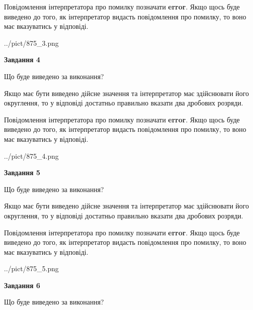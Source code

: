 \documentclass[12pt, ukrainian]{article}
\begin{document}
{\begin {Large}
Повідомлення інтерпретатора про помилку позначати \textbf{error}.
Якщо щось буде виведено до того, як інтерпретатор видасть повідомлення про помилку, 
то воно має вказуватись у відповіді. \par

\begin{center}
	{../pict/875_3.png}
\end{center}
\newpage

{\begin {center}\textbf{Завдання 4}\end {center}}\par
Що буде виведено за виконання? \par

Якщо має бути виведено дійсне значення та інтерпретатор має здійснювати його округлення, 
то у відповіді достатньо правильно вказати два дробових розряди.

Повідомлення інтерпретатора про помилку позначати \textbf{error}.
Якщо щось буде виведено до того, як інтерпретатор видасть повідомлення про помилку, 
то воно має вказуватись у відповіді. \par

\begin{center}
	{../pict/875_4.png}
\end{center}
\newpage

{\begin {center}\textbf{Завдання 5}\end {center}}\par
Що буде виведено за виконання? \par

Якщо має бути виведено дійсне значення та інтерпретатор має здійснювати його округлення, 
то у відповіді достатньо правильно вказати два дробових розряди.

Повідомлення інтерпретатора про помилку позначати \textbf{error}.
Якщо щось буде виведено до того, як інтерпретатор видасть повідомлення про помилку, 
то воно має вказуватись у відповіді. \par

\begin{center}
	{../pict/875_5.png}
\end{center}
\newpage

{\begin {center}\textbf{Завдання 6}\end {center}}\par
Що буде виведено за виконання? \par


\end{Large}}
\end{document}
